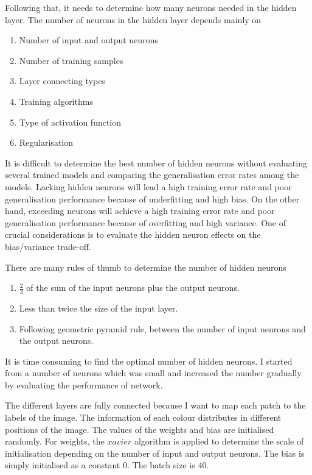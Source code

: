 Following that, it needs to determine how many neurons needed in the hidden layer. The number of neurons in the hidden layer depends mainly on
\begin{enumerate}
  \item Number of input and output neurons
  \item Number of training samples
  \item Layer connecting types
  \item Training algorithms
  \item Type of activation function
  \item Regularisation
\end{enumerate}
It is difficult to determine the best number of hidden neurons without evaluating several trained models and comparing the generalisation error rates among the models. Lacking hidden neurons will lead a high training error rate and poor generalisation performance because of underfitting and high bias. On the other hand, exceeding neurons will achieve a high training error rate and poor generalisation performance because of overfitting and high variance. One of crucial considerations is to evaluate the hidden neuron effects on the bias/variance trade-off.

There are many rules of thumb to determine the number of hidden neurons \citep{heaton2008introduction}
\begin{enumerate}
  \item $\frac{2}{3}$ of the sum of the input neurons plus the output neurons.
  \item Less than twice the size of the input layer.
  \item Following geometric pyramid rule, between the number of input neurons and the output neurons.
\end{enumerate}
It is time consuming to find the optimal number of hidden neurons. I started from a number of neurons which was small and increased the number gradually by evaluating the performance of network.

The different layers are fully connected because I want to map each patch to the labels of the image. The information of each colour distributes in different positions of the image. The values of the weights and bias are initialised randomly. For weights, the $xavier$ algorithm is applied to determine the scale of initialisation depending on the number of input and output neurons. The bias is simply initialised as a constant $0$. The batch size is $40$.

